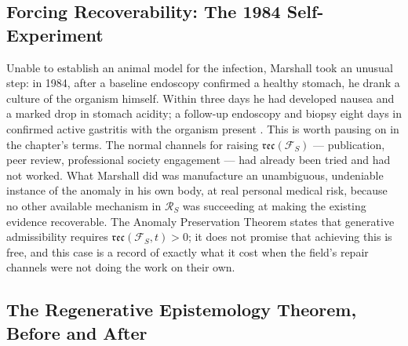 \documentclass[12pt,twoside,openright]{book}
\newcommand{\reco}{\mathfrak{rec}}
\begin{document}
\subsection{Forcing Recoverability: The 1984 Self-Experiment}

Unable to establish an animal model for the infection, Marshall
took an unusual step: in 1984, after a baseline endoscopy
confirmed a healthy stomach, he drank a culture of the organism
himself. Within three days he had developed nausea and a marked
drop in stomach acidity; a follow-up endoscopy and biopsy eight
days in confirmed active gastritis with the organism present
\parencite{marshall1985,marshall1984}.
This is worth pausing on in the chapter's terms. The normal
channels for raising $\reco(\mathcal{F}_S)$ --- publication, peer
review, professional society engagement --- had already been
tried and had not worked. What Marshall did was manufacture an
unambiguous, undeniable instance of the anomaly in his own body,
at real personal medical risk, because no other available
mechanism in $\mathcal{R}_S$ was succeeding at making the existing
evidence recoverable. The Anomaly Preservation Theorem states that
generative admissibility requires $\reco(\mathcal{F}_S, t) > 0$;
it does not promise that achieving this is free, and this case is
a record of exactly what it cost when the field's repair channels
were not doing the work on their own.

\subsection{The Regenerative Epistemology Theorem, Before and After}
\end{document}
